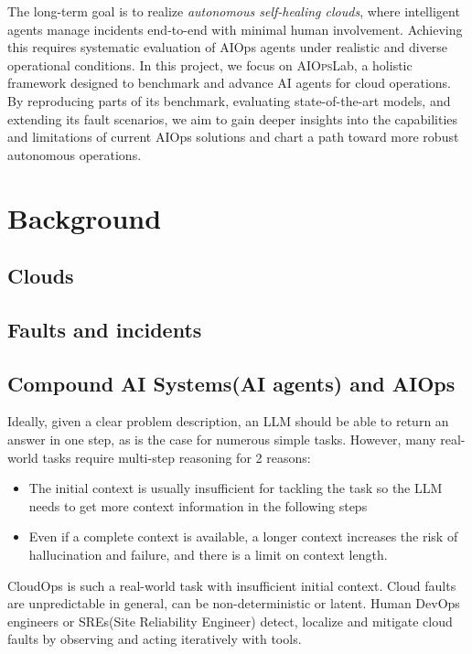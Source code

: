 \documentclass[conference]{IEEEtran}
\begin{document}
The long-term goal is to realize \textit{autonomous self-healing clouds}, where intelligent agents manage incidents end-to-end with minimal human involvement. Achieving this requires systematic evaluation of AIOps agents under realistic and diverse operational conditions. In this project, we focus on \textsc{AIOps}Lab, a holistic framework designed to benchmark and advance AI agents for cloud operations. By reproducing parts of its benchmark, evaluating state-of-the-art models, and extending its fault scenarios, we aim to gain deeper insights into the capabilities and limitations of current AIOps solutions and chart a path toward more robust autonomous operations.

\section{Background}

\subsection{Clouds}

\subsection{Faults and incidents}

\subsection{Compound AI Systems(AI agents) and AIOps}
Ideally, given a clear problem description, an LLM should be able to return an answer in one step, as is the case for numerous simple tasks. However, many real-world tasks require multi-step reasoning for 2 reasons: 
        \begin{itemize}
                \item The initial context is usually insufficient for tackling the task so the LLM needs to get more context information in the following steps  
                \item Even if a complete context is available, a longer context increases the risk of hallucination and failure, and there is a limit on context length.
        \end{itemize}

        CloudOps is such a real-world task with insufficient initial context. Cloud faults are unpredictable in general, can be non-deterministic or latent. Human DevOps engineers or SREs(Site Reliability Engineer) detect, localize and mitigate cloud faults by observing and acting iteratively with tools. 
\end{document}
